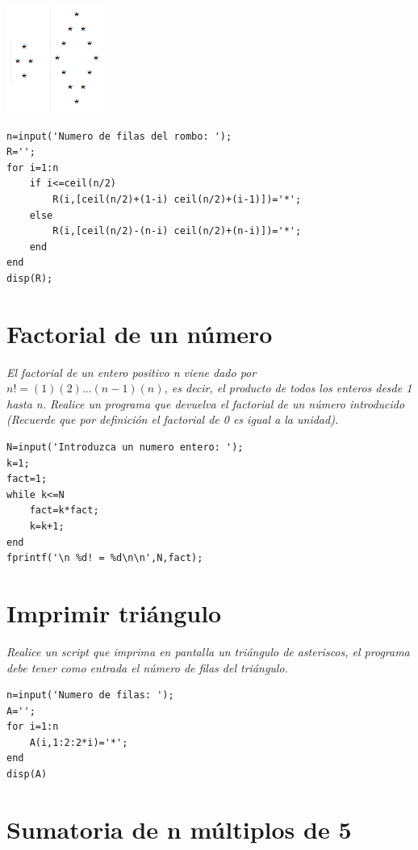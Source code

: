 \begin{center}
\includegraphics[scale=1]{src/rombo.png}
\end{center}



\begin{verbatim}
n=input('Numero de filas del rombo: ');
R='';
for i=1:n
    if i<=ceil(n/2)
        R(i,[ceil(n/2)+(1-i) ceil(n/2)+(i-1)])='*';
    else
        R(i,[ceil(n/2)-(n-i) ceil(n/2)+(n-i)])='*';
    end
end
disp(R);
\end{verbatim}

\section{Factorial de un número}

\textit{El factorial de un entero positivo n viene dado por $n!=(1)(2)...(n-1)(n)$, es decir, el producto 
de todos los enteros desde 1 hasta n. Realice un programa que devuelva el factorial de un número 
introducido (Recuerde que por definición el factorial de 0 es igual a la unidad).}



\begin{verbatim}
N=input('Introduzca un numero entero: ');
k=1;
fact=1;
while k<=N
    fact=k*fact;
    k=k+1;
end
fprintf('\n %d! = %d\n\n',N,fact);
\end{verbatim}


\section{Imprimir triángulo}

\textit{Realice un script que imprima en pantalla un triángulo de asteriscos, el programa debe tener como entrada el número de filas del triángulo.}



\begin{verbatim}
n=input('Numero de filas: ');
A='';
for i=1:n
    A(i,1:2:2*i)='*';
end
disp(A)
\end{verbatim}


\section{Sumatoria de n múltiplos de 5}

